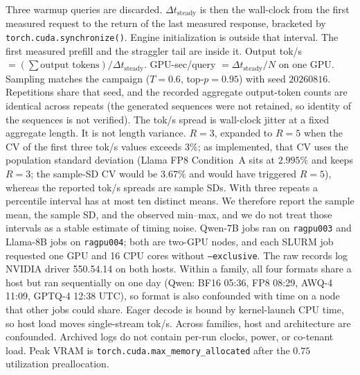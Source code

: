 \documentclass[11pt,a4paper]{article}
\begin{document}
Three warmup queries are discarded. $\Delta t_{\mathrm{steady}}$ is then the wall-clock from the first measured request to the return of the last measured response, bracketed by \texttt{torch.cuda.synchronize()}. Engine initialization is outside that interval. The first measured prefill and the straggler tail are inside it. Output tok/s $=(\sum \text{output tokens})/\Delta t_{\mathrm{steady}}$. GPU-sec/query $=\Delta t_{\mathrm{steady}}/N$ on one GPU. Sampling matches the campaign ($T=0.6$, top-$p=0.95$) with seed $20260816$. Repetitions share that seed, and the recorded aggregate output-token counts are identical across repeats (the generated sequences were not retained, so identity of the sequences is not verified). The tok/s spread is wall-clock jitter at a fixed aggregate length. It is not length variance. $R=3$, expanded to $R=5$ when the CV of the first three tok/s values exceeds $3\%$; as implemented, that CV uses the population standard deviation (Llama FP8 Condition~A sits at $2.995\%$ and keeps $R=3$; the sample-SD CV would be $3.67\%$ and would have triggered $R=5$), whereas the reported tok/s spreads are sample SDs. With three repeats a percentile interval has at most ten distinct means. We therefore report the sample mean, the sample SD, and the observed min--max, and we do not treat those intervals as a stable estimate of timing noise. Qwen-7B jobs ran on \texttt{ragpu003} and Llama-8B jobs on \texttt{ragpu004}; both are two-GPU nodes, and each SLURM job requested one GPU and 16 CPU cores without \texttt{--exclusive}. The raw records log NVIDIA driver 550.54.14 on both hosts. Within a family, all four formats share a host but ran sequentially on one day (Qwen: BF16 05:36, FP8 08:29, AWQ-4 11:09, GPTQ-4 12:38 UTC), so format is also confounded with time on a node that other jobs could share. Eager decode is bound by kernel-launch CPU time, so host load moves single-stream tok/s. Across families, host and architecture are confounded. Archived logs do not contain per-run clocks, power, or co-tenant load. Peak VRAM is \texttt{torch.cuda.max\_memory\_allocated} after the $0.75$ utilization preallocation.
\end{document}
